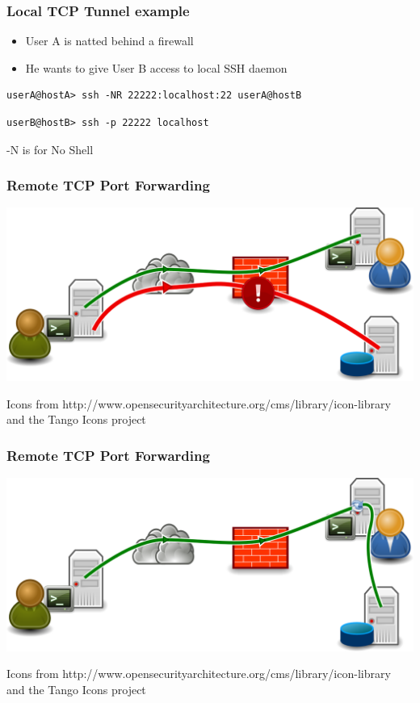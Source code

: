 \begin{frame}[fragile]
\frametitle{Local TCP Tunnel example}
\begin{itemize}
\item User A is natted behind a firewall
\item He wants to give User B access to local SSH daemon
\end{itemize}
\begin{lstlisting}
userA@hostA> ssh -NR 22222:localhost:22 userA@hostB
\end{lstlisting}
\begin{lstlisting}
userB@hostB> ssh -p 22222 localhost
\end{lstlisting}
\begin{center}-N is for No Shell\end{center}
\begin{frame}
    \frametitle{Remote TCP Port Forwarding}
\begin{center}
    \includegraphics[height=.34\paperheight]{drawing-4.png}
\end{center}
\begin{flushright}
    \tiny\color{white}Icons from http://www.opensecurityarchitecture.org/cms/library/icon-library\\and the Tango Icons project
\end{flushright}
\end{frame}
\begin{frame}
    \frametitle{Remote TCP Port Forwarding}
\begin{center}
    \includegraphics[height=.34\paperheight]{drawing-5.png}
\end{center}
\begin{flushright}
    \tiny\color{white}Icons from http://www.opensecurityarchitecture.org/cms/library/icon-library\\and the Tango Icons project
\end{flushright}
\end{frame}

\end{frame}

